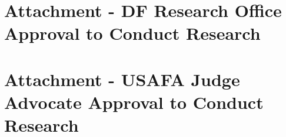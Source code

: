 \documentclass{article}
\begin{document}
\newpage
\section{Attachment - DF Research Office Approval to Conduct Research}
\label{sec:DFER}
\centering

\newpage
\section{Attachment - USAFA Judge Advocate Approval to Conduct Research}
\label{sec:JA}
\centering

%
\end{document}
